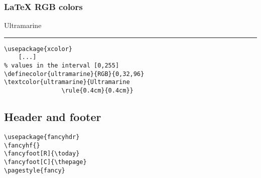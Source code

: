 \subsubsection{LaTeX RGB colors}
\textcolor{ultramarine}{Ultramarine \rule{0.4cm}{0.4cm}}
\begin{minipage}[c]{3cm}
  \begin{verbatim}
\usepackage{xcolor}
    [...]
% values in the interval [0,255]
\definecolor{ultramarine}{RGB}{0,32,96}
\textcolor{ultramarine}{Ultramarine
                \rule{0.4cm}{0.4cm}}
  \end{verbatim}
\end{minipage}

\subsection{Header and footer}
\begin{verbatim}
\usepackage{fancyhdr}
\fancyhf{}
\fancyfoot[R]{\today}
\fancyfoot[C]{\thepage}
\pagestyle{fancy}
\end{verbatim}
